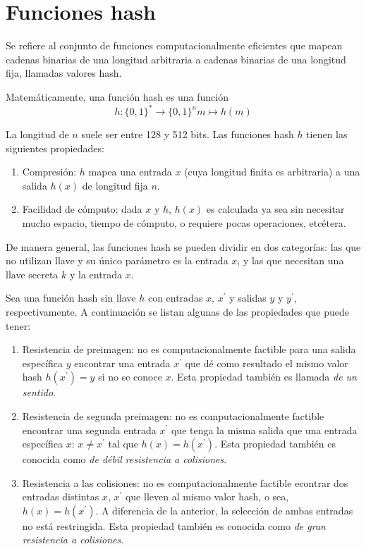 %
%
\newpage
\section{Funciones hash}

Se refiere al conjunto de funciones computacionalmente eficientes que
mapean cadenas binarias de una longitud arbitraria a cadenas binarias
de una longitud fija, llamadas valores hash.

Matemáticamente, una función hash es una función
\begin{equation}
  \label{funcion_hash_def}
 	h: \{0, 1\}^* \longrightarrow \{0,1\}^n 
 	m \longmapsto h(m)
\end{equation}

La longitud de $n$ suele ser entre 128 y 512 bits. Las funciones hash 
$h$ tienen las siguientes propiedades:
\begin{enumerate}
	\item Compresión: $h$ mapea una entrada $x$ (cuya longitud
		finita es arbitraria) a una salida $h(x)$ de longitud fija $n$.
	\item Facilidad de cómputo: dada $x$ y $h$, $h(x)$ es 
		calculada ya sea sin necesitar mucho espacio, tiempo de cómputo, o 
		requiere pocas operaciones, etcétera.
\end{enumerate} 

De manera general, las funciones hash se pueden dividir en dos 
categorías: las que no utilizan llave y su único parámetro es la entrada
$x$, y las que necesitan una llave secreta $k$ y la entrada $x$.

Sea una función hash sin llave $h$ con entradas $x$, $x^\prime$ y 
salidas $y$ y $y^\prime$, respectivamente. A continuación se listan
algunas de las propiedades que puede tener:
\begin{enumerate}
	\item Resistencia de preimagen: no es computacionalmente factible
		para una salida específica $y$ encontrar una entrada $x^\prime$ que 
		dé como resultado el mismo valor hash $h(x^\prime) = y$ si no se
		conoce $x$. Esta propiedad también es llamada 
		\textit{de un sentido}.
	\item Resistencia de segunda preimagen: no es computacionalmente
		factible encontrar una segunda entrada $x^\prime$  que tenga la 
		misma salida que una entrada específica $x$: $x \neq x^\prime$
		tal que $h(x) = h(x^\prime)$. Esta propiedad también es conocida 
		como \textit{de débil resistencia a colisiones}.
	\item Resistencia a las colisiones: no es computacionalmente factible 
		econtrar dos entradas distintas $x$, $x^\prime$ que lleven al mismo 
		valor hash, o sea, $h(x) = h(x^\prime)$. A diferencia de la 
		anterior, la selección de ambas entradas no está restringida. Esta
		propiedad también es conocida como 
		\textit{de gran resistencia a colisiones}.
\end{enumerate}

